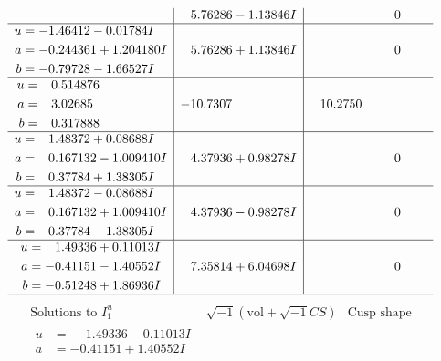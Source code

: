 \documentclass[1p]{elsarticle_modified}
\theoremstyle{definition}
\newcommand{\I}{\sqrt{-1}}
\begin{document}
$$\begin{array}{c|c|c}
 & \phantom{-}5.76286 - 1.13846 I & \phantom{-0.000000 } 0 \\ \hline\begin{aligned}
u &= -1.46412 - 0.01784 I \\
a &= -0.244361 + 1.204180 I \\
b &= -0.79728 - 1.66527 I\end{aligned}
 & \phantom{-}5.76286 + 1.13846 I & \phantom{-0.000000 } 0 \\ \hline\begin{aligned}
u &= \phantom{-}0.514876\phantom{ +0.000000I} \\
a &= \phantom{-}3.02685\phantom{ +0.000000I} \\
b &= \phantom{-}0.317888\phantom{ +0.000000I}\end{aligned}
 & -10.7307\phantom{ +0.000000I} & \phantom{-}10.2750\phantom{ +0.000000I} \\ \hline\begin{aligned}
u &= \phantom{-}1.48372 + 0.08688 I \\
a &= \phantom{-}0.167132 - 1.009410 I \\
b &= \phantom{-}0.37784 + 1.38305 I\end{aligned}
 & \phantom{-}4.37936 + 0.98278 I & \phantom{-0.000000 } 0 \\ \hline\begin{aligned}
u &= \phantom{-}1.48372 - 0.08688 I \\
a &= \phantom{-}0.167132 + 1.009410 I \\
b &= \phantom{-}0.37784 - 1.38305 I\end{aligned}
 & \phantom{-}4.37936 - 0.98278 I & \phantom{-0.000000 } 0 \\ \hline\begin{aligned}
u &= \phantom{-}1.49336 + 0.11013 I \\
a &= -0.41151 - 1.40552 I \\
b &= -0.51248 + 1.86936 I\end{aligned}
 & \phantom{-}7.35814 + 6.04698 I & \phantom{-0.000000 } 0\\
 \hline 
 \end{array}$$\newpage$$\begin{array}{c|c|c}  
\text{Solutions to }I^u_{1}& \I (\text{vol} + \sqrt{-1}CS) & \text{Cusp shape}\\
 \hline 
\begin{aligned}
u &= \phantom{-}1.49336 - 0.11013 I \\
a &= -0.41151 + 1.40552 I \\

\end{aligned}
\end{array}$$
\end{document}
